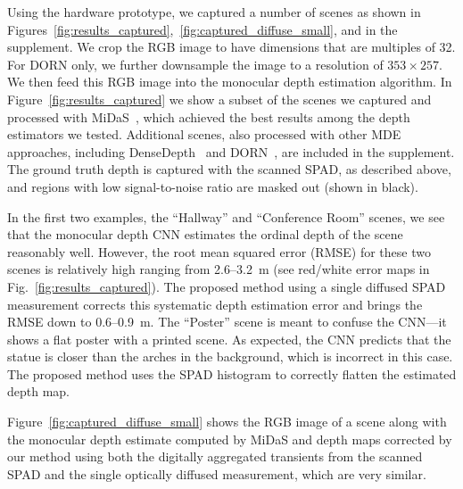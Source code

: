 Using the hardware prototype, we captured a number of scenes as shown in
Figures~\ref{fig:results_captured},~\ref{fig:captured_diffuse_small}, and in the supplement. We crop the RGB image
to have dimensions that are multiples of 32. For DORN only, we further
downsample the image to a resolution of $353 \times 257$. We then feed this RGB
image into the monocular depth estimation algorithm. In
Figure~\ref{fig:results_captured} we show a subset of the scenes we captured and
processed with MiDaS~\cite{Lasinger:2019}, which achieved the best results among
the depth estimators we tested. Additional scenes, also processed with other MDE
approaches, including DenseDepth~\cite{Alhashim2018} and DORN~\cite{Fu2018}, are
included in the supplement. The ground truth depth is captured with the scanned
SPAD, as described above, and regions with low signal-to-noise ratio are masked
out (shown in black).

In the first two examples, the ``Hallway'' and ``Conference Room'' scenes, we
see that the monocular depth CNN estimates the ordinal depth of the scene
reasonably well. However, the root mean squared error (RMSE) for these two
scenes is relatively high ranging from 2.6--3.2~m (see red/white error maps in
Fig.~\ref{fig:results_captured}). The proposed method using a single diffused
SPAD measurement corrects this systematic depth estimation error and brings the
RMSE down to 0.6--0.9~m. The ``Poster'' scene is meant to confuse the CNN---it
shows a flat poster with a printed scene. As expected, the CNN predicts that the
statue is closer than the arches in the background, which is incorrect in this
case. The proposed method uses the SPAD histogram to correctly flatten the
estimated depth map.

Figure~\ref{fig:captured_diffuse_small} shows the RGB image of a scene along with the monocular depth estimate computed by MiDaS and depth maps corrected by our method using both the digitally aggregated transients from the scanned SPAD and the single optically diffused measurement, which are very similar. %

